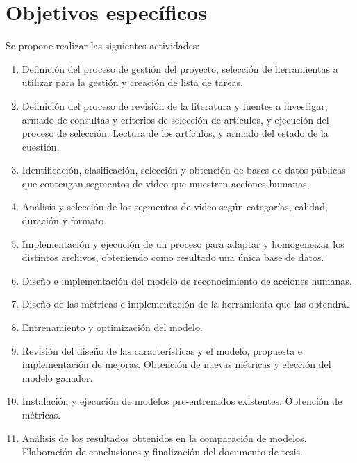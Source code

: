 \documentclass[10pt]{article}
\begin{document}
\section{Objetivos específicos}

Se propone realizar las siguientes actividades: 

\begin{enumerate}
	
	\item Definición del proceso de gestión del proyecto, selección de herramientas a utilizar para la gestión y creación de lista de tareas.
	
	\item Definición del proceso de revisión de la literatura y fuentes a investigar, armado de consultas y criterios de selección de artículos, y ejecución del proceso de selección. Lectura de los artículos, y armado del estado de la cuestión.
	
	\item Identificación, clasificación, selección y obtención de bases de datos públicas que contengan segmentos de video que muestren acciones humanas.
	
	\item Análisis y selección de los segmentos de video según categorías, calidad, duración y formato.
	
	\item Implementación y ejecución de un proceso para adaptar y homogeneizar los distintos archivos, obteniendo como resultado una única base de datos.
	
	\item Diseño e implementación del modelo de reconocimiento de acciones humanas.
	
	\item Diseño de las métricas e implementación de la herramienta que las obtendrá.
	
	\item Entrenamiento y optimización del modelo.
	
	\item Revisión del diseño de las características y el modelo, propuesta e implementación de mejoras. Obtención de nuevas métricas y elección del modelo ganador.
	
	\item Instalación y ejecución de modelos pre-entrenados existentes. Obtención de métricas.
	
	\item Análisis de los resultados obtenidos en la comparación de modelos.  Elaboración de conclusiones y finalización del documento de tesis.
	
\end{enumerate}
\end{document}
